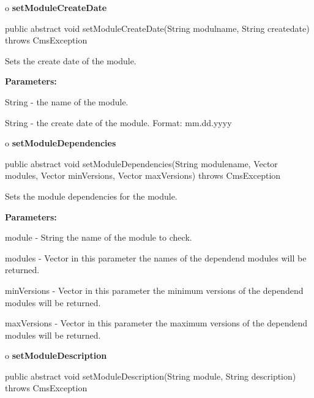 o {\bf setModuleCreateDate} 

\begin{PRE}
 public abstract void setModuleCreateDate(String modulname,
                                          String createdate) throws CmsException
\end{PRE}

\begin{description}
\htmlDD Sets the create date of the module. 

\begin{description}
\item {\bf Parameters:}  

String - the name of the module.  

String - the create date of the module. Format: mm.dd.yyyy  
\end{description}

\end{description}

o {\bf setModuleDependencies} 

\begin{PRE}
 public abstract void setModuleDependencies(String modulename,
                                            Vector modules,
                                            Vector minVersions,
                                            Vector maxVersions) throws CmsException
\end{PRE}

\begin{description}
\htmlDD Sets the module dependencies for the module. 

\begin{description}
\item {\bf Parameters:}  

module - String the name of the module to check.  

modules - Vector in this parameter the names of the dependend modules will be
returned.  

minVersions - Vector in this parameter the minimum versions of the dependend
modules will be returned.  

maxVersions - Vector in this parameter the maximum versions of the dependend
modules will be returned.  
\end{description}

\end{description}

o {\bf setModuleDescription} 

\begin{PRE}
 public abstract void setModuleDescription(String module,
                                           String description) throws CmsException
\end{PRE}


